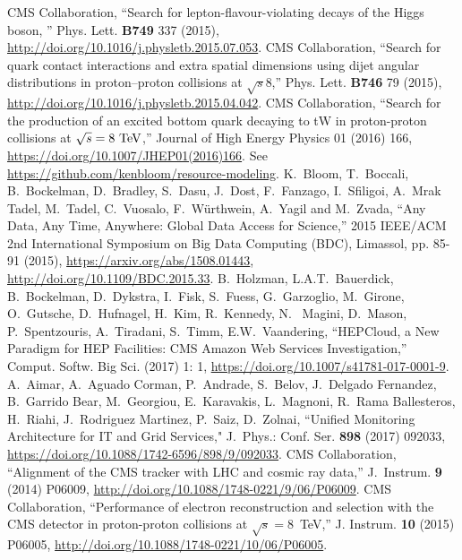 \begin{thebibliography}{99}
%
%
%
 CMS Collaboration, ``Search for lepton-flavour-violating decays of the Higgs boson, '' Phys. Lett. {\bf B749} 337 (2015), \url{http://doi.org/10.1016/j.physletb.2015.07.053}.
%
CMS Collaboration, ``Search for quark contact interactions and extra spatial dimensions using dijet angular distributions in proton–proton collisions at $\sqrt{s}$8\TeV,'' Phys. Lett. {\bf B746} 79 (2015), \url{http://doi.org/10.1016/j.physletb.2015.04.042}.
%
CMS Collaboration, ``Search for the production of an excited bottom quark decaying to tW in proton-proton collisions at $\sqrt{s} = 8\TeV$,'' Journal of High Energy Physics 01 (2016) 166,  \url{https://doi.org/10.1007/JHEP01(2016)166}.
%
%
  See
  \url{https://github.com/kenbloom/resource-modeling}.
 K.~Bloom, T.~Boccali, B.~Bockelman, D.~Bradley, S.~Dasu,
  J.~Dost, F.~Fanzago, I.~Sfiligoi, A.~Mrak Tadel, M.~Tadel, C.~Vuosalo,
  F.~W{\"u}rthwein, A.~Yagil and M.~Zvada, ``Any Data, Any Time, Anywhere:
  Global Data Access for Science,'' 2015 IEEE/ACM 2nd International
  Symposium on Big Data Computing (BDC), Limassol, pp. 85-91 (2015),
  \url{https://arxiv.org/abs/1508.01443}, \url{http://doi.org/10.1109/BDC.2015.33}.
%
 B.~Holzman, L.A.T.~Bauerdick, B.~Bockelman, D.~Dykstra, I.~Fisk, S.~Fuess, G.~Garzoglio, M.~Girone, O.~Gutsche, D.~Hufnagel, H.~Kim, R.~Kennedy, N.~ Magini, D.~Mason, P.~Spentzouris, A.~Tiradani, S.~Timm, E.W.~Vaandering, ``HEPCloud, a New Paradigm for HEP Facilities: CMS Amazon Web Services Investigation,''
Comput. Softw. Big Sci. (2017) 1: 1, \url{https://doi.org/10.1007/s41781-017-0001-9}.
%
 A.~Aimar, A.~Aguado Corman, P.~Andrade, S.~Belov, J.~Delgado Fernandez, B.~Garrido Bear, M.~Georgiou, E.~Karavakis, L.~Magnoni, R.~Rama Ballesteros, H.~Riahi, J.~Rodriguez Martinez, P.~Saiz, D.~Zolnai, ``Unified Monitoring Architecture for IT and Grid Services," J.~Phys.: Conf. Ser. {\bf 898} (2017) 092033, \url{https://doi.org/10.1088/1742-6596/898/9/092033}.
%
%
CMS Collaboration, ``Alignment of the CMS tracker with LHC and cosmic ray data,'' J.~Instrum. \textbf{9} (2014) P06009, 
\url{http://doi.org/10.1088/1748-0221/9/06/P06009}.
%
CMS Collaboration, ``Performance of electron reconstruction and selection with the CMS detector in proton-proton collisions at $\sqrt{s}=$8~TeV,'' J. Instrum. {\bf 10} (2015) P06005, \url{http://doi.org/10.1088/1748-0221/10/06/P06005}.

\end{thebibliography}
